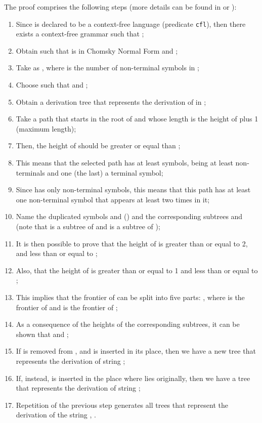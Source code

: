 \documentclass {elsarticle}
\begin{document}
The proof comprises the following steps (more details can be found in \cite {sudkamp-2006} or \cite {ramos-2009}):

\begin {enumerate}
\item Since  is declared to be a context-free language (predicate \texttt {cfl}), then there exists a context-free grammar  such that ;
\item Obtain  such that  is in Chomsky Normal Form and ;
\item Take  as , where  is the number of non-terminal symbols in ;
\item Choose  such that  and ;
\item Obtain a derivation tree  that represents the derivation of  in ;
\item Take a path that starts in the root of  and whose length is the height of  plus 1 (maximum length);
\item Then, the height of  should be greater or equal than ;
\item This means that the selected path has at least  symbols, being at least  non-terminals and one (the last) a terminal symbol;
\item Since  has only  non-terminal symbols, this means that this path has at least one non-terminal symbol that appears at least two times in it;
\item Name the duplicated symbols  and  () and the corresponding subtrees  and  (note that  is a subtree of  and  is a subtree of );
\item It is then possible to prove that the height of  is greater than or equal to 2, and less than or equal to ;
\item Also, that the height of   is greater than or equal to 1 and less than or equal to ;
\item This implies that the frontier of  can be split into five parts: , where  is the frontier of  and  is the frontier of ;
\item As a consequence of the heights of the corresponding subtrees, it can be shown that  and ;
\item If  is removed from , and  is inserted in its place, then we have a new tree  that represents the derivation of string ;
\item If, instead,  is inserted in the place where  lies originally, then we have a tree  that represents the derivation of string ;
\item Repetition of the previous step generates all trees  that represent the derivation of the string , .
\end {enumerate}
\end{document}
